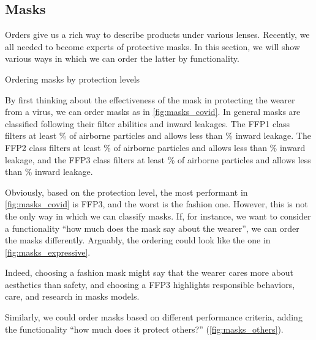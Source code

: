 
\ifextraspace{\vfill\clearpage}

\subsection{Masks}

Orders give us a rich way to describe products under various lenses.
Recently, we all needed to become experts of protective masks.
In this section, we will show various ways in which we can order the latter by functionality.

\begin{marginfigure}
    \centering
    \caption{Ordering masks by protection levels}
    \label{fig:masks_covid}
\end{marginfigure}
By first thinking about the effectiveness of the mask in protecting the wearer from a virus, we can order masks as in \cref{fig:masks_covid}.
In general masks are classified following their filter abilities and inward leakages.
The FFP1 class filters at least \unit[80]{\%} of airborne particles and allows less than \unit[22]{\%} inward leakage.
The FFP2 class filters at least \unit[96]{\%} of airborne particles and allows less than \unit[8]{\%} inward leakage, and the FFP3 class filters at least \unit[99]{\%} of airborne particles and allows less than \unit[2]{\%} inward leakage.

Obviously, based on the protection level, the most performant in \cref{fig:masks_covid} is FFP3, and the worst is the fashion one.
However, this is not the only way in which we can classify masks.
If, for instance, we want to consider a functionality ``how much does the mask say about the wearer'', we can order the masks differently.
Arguably, the ordering could look like the one in \cref{fig:masks_expressive}.

Indeed, choosing a fashion mask might say that the wearer cares more about aesthetics than safety, and choosing a FFP3 highlights responsible behaviors, care, and research in masks models.

Similarly, we could order masks based on different performance criteria, adding the functionality ``how much does it protect others?'' (\cref{fig:masks_others}).


